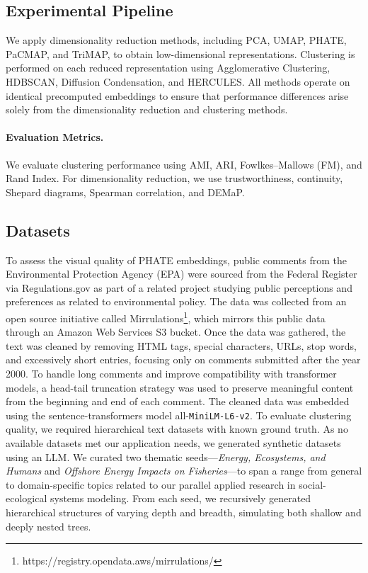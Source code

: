 \subsection{Experimental Pipeline}

We apply dimensionality reduction methods, including PCA, UMAP, PHATE, PaCMAP, and TriMAP, to obtain low-dimensional representations.
Clustering is performed on each reduced representation using Agglomerative Clustering, HDBSCAN, Diffusion Condensation, and HERCULES. All methods operate on identical precomputed embeddings to ensure that performance differences arise solely from the dimensionality reduction and clustering methods.
\paragraph{Evaluation Metrics.}
We evaluate clustering performance using AMI, ARI, Fowlkes–Mallows (FM), and Rand Index. 
For dimensionality reduction, we use trustworthiness, continuity, Shepard diagrams, Spearman correlation, and DEMaP.
\subsection{Datasets}
To assess the visual quality of PHATE embeddings, public comments from the Environmental Protection Agency (EPA) were sourced from the Federal Register via Regulations.gov as part of a related project studying public perceptions and preferences as related to environmental policy. The data was collected from an open source initiative called Mirrulations\footnote{https://registry.opendata.aws/mirrulations/}, which mirrors this public data through an Amazon Web Services S3 bucket. Once the data was gathered, the text was cleaned by removing HTML tags, special characters, URLs, stop words, and excessively short entries, focusing only on comments submitted after the year 2000. To handle long comments and improve compatibility with transformer models, a head-tail truncation strategy \cite{sun2019fine} was used to preserve meaningful content from the beginning and end of each comment. The cleaned data was embedded using the sentence-transformers model all-\texttt{MiniLM-L6-v2}. 
To evaluate clustering quality, we required hierarchical text datasets with known ground truth. As no available datasets met our application needs, we generated synthetic datasets using an LLM. We curated two thematic seeds—\textit{Energy, Ecosystems, and Humans} and \textit{Offshore Energy Impacts on Fisheries}—to span a range from general to domain-specific topics related to our parallel applied research in social-ecological systems modeling. From each seed, we recursively generated hierarchical structures of varying depth and breadth, simulating both shallow and deeply nested trees.

